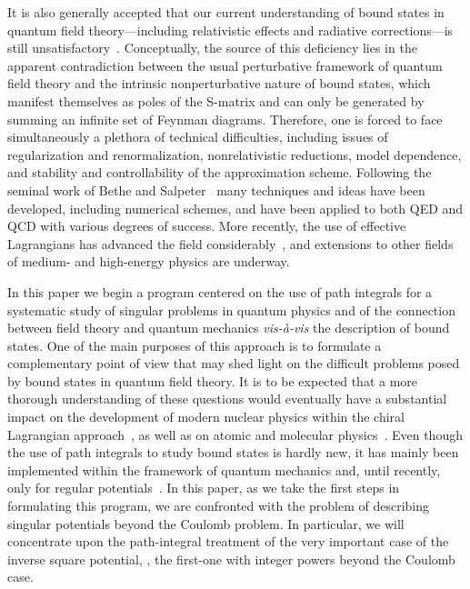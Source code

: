\documentclass[a4paper,preprint,draft,showpacs,amsmath,amsfonts,amssymb,aps,prd]{revtex4}%
\begin{document}
It is also generally accepted that 
our current
understanding 
of bound states in quantum field theory---including relativistic effects and 
radiative corrections---is still unsatisfactory~\cite{wei:95,jac:private}.
Conceptually, the source of this deficiency lies in the apparent
contradiction between the usual perturbative framework of quantum field
theory and the intrinsic nonperturbative nature 
of bound states, which manifest themselves
as poles of the S-matrix and can only be generated by summing an infinite 
set of Feynman diagrams.   
Therefore, one is forced to face simultaneously
a plethora of technical difficulties, including
issues of regularization and renormalization,
nonrelativistic reductions, model dependence, and stability and
controllability of the approximation scheme.
Following the seminal work of Bethe and 
Salpeter~\cite{bet:51} many techniques and ideas have been developed, 
including numerical schemes, and have been applied to both QED and QCD with 
various degrees of success.  
More recently, the use of effective Lagrangians
has advanced the field considerably~\cite{recent_review},
and extensions to other fields of medium- and
high-energy physics are underway.  

In this paper we begin a program centered on the use of path
integrals for a systematic study of singular problems in quantum physics
and of the connection between field theory and
quantum mechanics {\it vis-\`{a}-vis\/} 
the description of bound states.
One of the main purposes of this approach is to formulate a
complementary point of view that may shed light on the 
difficult problems posed by bound states in quantum field theory.
It is to be expected that a more thorough 
understanding of these questions would eventually have a
substantial impact on the development of modern nuclear physics within 
the chiral Lagrangian approach~\cite{recent_review}, 
as well as on atomic and 
molecular physics~\cite{fra:71}.  
Even though the use of path integrals to study bound
states is hardly new, it has mainly been implemented within
the framework of quantum mechanics and, until recently, only for regular
potentials~\cite{kleinert,sav:99}. 
In this paper,
as we take the first steps in formulating this program,
we are confronted with the problem of describing singular potentials beyond
the Coulomb problem.  
In particular, we will concentrate upon the path-integral
treatment of the very important case of the inverse square potential,
\coordHE{}, the first-one with integer powers beyond the Coulomb case.  
\end{document}
